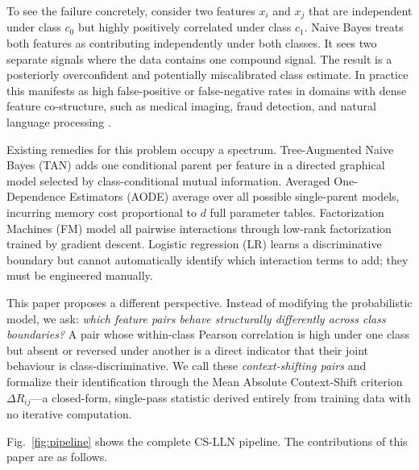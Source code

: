 \documentclass[conference]{IEEEtran}
\begin{document}
To see the failure concretely, consider two features $x_i$ and $x_j$ that
are independent under class $c_0$ but highly positively correlated under
class $c_1$.
Naive Bayes treats both features as contributing independently under both
classes.
It sees two separate signals where the data contains one compound signal.
The result is a posteriorly overconfident and potentially miscalibrated
class estimate.
In practice this manifests as high false-positive or false-negative rates
in domains with dense feature co-structure, such as medical imaging,
fraud detection, and natural language processing \cite{domingos1997}.

Existing remedies for this problem occupy a spectrum.
Tree-Augmented Naive Bayes (TAN) \cite{friedman1997} adds one conditional
parent per feature in a directed graphical model selected by class-conditional
mutual information.
Averaged One-Dependence Estimators (AODE) \cite{webb2005} average over all
possible single-parent models, incurring memory cost proportional to $d$
full parameter tables.
Factorization Machines (FM) \cite{rendle2010} model all pairwise interactions
through low-rank factorization trained by gradient descent.
Logistic regression (LR) \cite{bishop2006} learns a discriminative
boundary but cannot automatically identify which interaction terms to add;
they must be engineered manually.

This paper proposes a different perspective.
Instead of modifying the probabilistic model, we ask: \textit{which feature
pairs behave structurally differently across class boundaries?}
A pair whose within-class Pearson correlation is high under one class but
absent or reversed under another is a direct indicator that their joint
behaviour is class-discriminative.
We call these \emph{context-shifting pairs} and formalize their identification
through the Mean Absolute Context-Shift criterion $\Delta R_{ij}$---a
closed-form, single-pass statistic derived entirely from training data with
no iterative computation.

Fig.~\ref{fig:pipeline} shows the complete CS-LLN pipeline.
The contributions of this paper are as follows.
\end{document}
